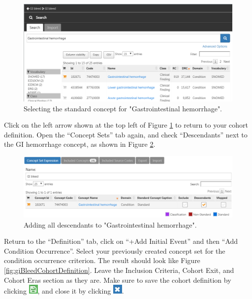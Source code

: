 \documentclass[11pt]{book}
\theoremstyle{definition}
\theoremstyle{definition}
\theoremstyle{definition}
\theoremstyle{remark}
\begin{document}
\begin{figure}

{\centering \includegraphics[width=1\linewidth]{images/SuggestedAnswers/giBleedSearch} 

}

\caption{Selecting the standard concept for "Gastrointestinal hemorrhage".}\label{fig:giBleedSearch}
\end{figure}

Click on the left arrow shown at the top left of Figure
\ref{fig:giBleedSearch} to return to your cohort definition. Open the
``Concept Sets'' tab again, and check ``Descendants'' next to the GI
hemorrhage concept, as shown in Figure \ref{fig:giBleedDescendants}.

\begin{figure}

{\centering \includegraphics[width=1\linewidth]{images/SuggestedAnswers/giBleedDescendants} 

}

\caption{Adding all descendants to "Gastrointestinal hemorrhage".}\label{fig:giBleedDescendants}
\end{figure}

Return to the ``Definition'' tab, click on ``+Add Initial Event'' and
then ``Add Condition Occurrence''. Select your previously created
concept set for the condition occurrence criterion. The result should
look like Figure \ref{fig:giBleedCohortDefinition}. Leave the Inclusion
Criteria, Cohort Exit, and Cohort Eras section as they are. Make sure to
save the cohort definition by clicking
\includegraphics{images/Cohorts/save.png}, and close it by clicking
\includegraphics{images/SuggestedAnswers/close.png}.
\end{document}
